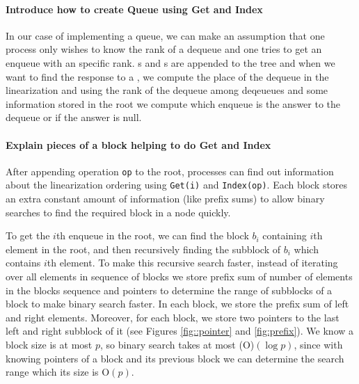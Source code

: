 \documentclass[10pt]{article}
\newcommand{\nf}[1]{{\normalfont{\texttt{#1}}}}
\theoremstyle{definition}
\begin{document}
\paragraph{Introduce how to create Queue using Get and Index} In our case of implementing a queue, we can make an assumption that one process only wishes to know the rank of a dequeue and one tries to get an enqueue with an specific rank. \nf{Enqueue}s and \nf{Dequeue}s are appended to the tree and when we want to find the response to a \nf{Dequeue}, we compute the place of the dequeue in the linearization and using the rank of the dequeue among deqeueues and some information stored in the root we compute which enqueue is the answer to the dequeue or if the answer is null. 

\paragraph{Explain pieces of a block helping to do Get and Index}
After appending operation \texttt{op} to the root, processes can find out information about the linearization ordering using \texttt{Get(i)} and \texttt{Index(op)}. Each block stores an extra constant amount of information (like prefix sums) to allow binary searches to find the required block in a node quickly.


To get the $i$th enqueue in the root, we can find the block $b_i$ containing $i$th element in the root, and then recursively finding the subblock of $b_i$ which contains $i$th element. To make this recursive search faster, instead of iterating over all elements in sequence of blocks we store prefix sum of number of elements in the blocks sequence and pointers to determine the range of subblocks of a block to make binary search faster. In each block, we store the prefix sum of left and right elements. Moreover, for each block, we store two pointers to the last left and right subblock of it (see Figures \ref{fig::pointer} and \ref{fig:prefix}). We know a block size is at most $p$, so binary search takes at most \textsc(O)$(\log p)$, since  with knowing pointers of a block and its previous block we can determine the search range which its size is \textsc{O}$(p)$.
\end{document}
